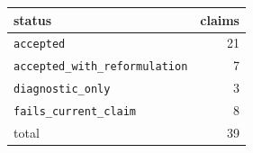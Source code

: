 \begin{tabular}{lr}
\hline
status & claims \\
\hline
\texttt{accepted} & 21 \\
\texttt{accepted\_with\_reformulation} & 7 \\
\texttt{diagnostic\_only} & 3 \\
\texttt{fails\_current\_claim} & 8 \\
\hline
total & 39 \\
\hline
\end{tabular}
